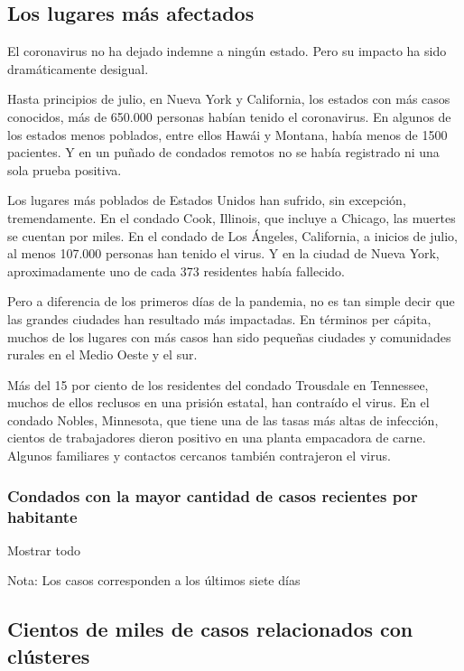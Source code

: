 \hypertarget{los-lugares-muxe1s-afectados}{%
\subsection{Los lugares más
afectados}\label{los-lugares-muxe1s-afectados}}

El coronavirus no ha dejado indemne a ningún estado. Pero su impacto ha
sido dramáticamente desigual.

Hasta principios de julio, en Nueva York y California, los estados con
más casos conocidos, más de 650.000 personas habían tenido el
coronavirus. En algunos de los estados menos poblados, entre ellos Hawái
y Montana, había menos de 1500 pacientes. Y en un puñado de condados
remotos no se había registrado ni una sola prueba positiva.

Los lugares más poblados de Estados Unidos han sufrido, sin excepción,
tremendamente. En el condado Cook, Illinois, que incluye a Chicago, las
muertes se cuentan por miles. En el condado de Los Ángeles, California,
a inicios de julio, al menos 107.000 personas han tenido el virus. Y en
la ciudad de Nueva York, aproximadamente uno de cada 373 residentes
había fallecido.

Pero a diferencia de los primeros días de la pandemia, no es tan simple
decir que las grandes ciudades han resultado más impactadas. En términos
per cápita, muchos de los lugares con más casos han sido pequeñas
ciudades y comunidades rurales en el Medio Oeste y el sur.

Más del 15 por ciento de los residentes del condado Trousdale en
Tennessee, muchos de ellos reclusos en una prisión estatal, han
contraído el virus. En el condado Nobles, Minnesota, que tiene una de
las tasas más altas de infección, cientos de trabajadores dieron
positivo en una planta empacadora de carne. Algunos familiares y
contactos cercanos también contrajeron el virus.

\hypertarget{condados-con-la-mayor-cantidad-de-casos-recientes-por-habitante}{%
\subsubsection{Condados con la mayor cantidad de casos recientes por
habitante}\label{condados-con-la-mayor-cantidad-de-casos-recientes-por-habitante}}

Mostrar todo

Nota: Los casos corresponden a los últimos siete días

\hypertarget{cientos-de-miles-de-casos-relacionados-con-cluxfasteres}{%
\subsection{Cientos de miles de casos relacionados con
clústeres}\label{cientos-de-miles-de-casos-relacionados-con-cluxfasteres}}

